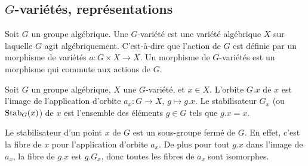 \subsection{$G$-variétés, représentations}

\begin{defn}[$G$-variété]
Soit $G$ un groupe algébrique. Une $G$-variété est une variété algébrique $X$ sur laquelle $G$ agit algébriquement. C'est-à-dire que l'action de $G$ est définie par un morphisme de variétés $a:G\times X\rightarrow X$. Un morphisme de $G$-variétés est un morphisme qui commute aux actions de $G$. 
\end{defn}

\begin{defn}
Soit $G$ un groupe algébrique, $X$ une $G$-variété, et $x\in X$. L'orbite $G.x$ de $x$ est l'image de l'application d'orbite $a_x:G\rightarrow X$, $g\mapsto g.x$. Le stabilisateur $G_x$ (ou $\operatorname{Stab}_G(x)$) de $x$ est l'ensemble des éléments $g\in G$ tels que $g.x=x$.  
\end{defn}

Le stabilisateur d'un point $x$ de $G$ est un sous-groupe fermé de $G$. En effet, c'est la fibre de $x$ pour l'application d'orbite $a_x$. De plus pour tout $g.x$ dans l'image de $a_x$, la fibre de $g.x$ est $g.G_x$, donc toutes les fibres de $a_x$ sont isomorphes.

